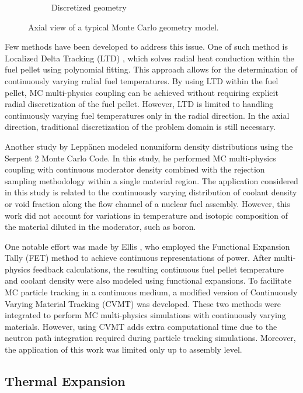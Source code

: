 \begin{figure}
\begin{subfigure}[b]{0.25\textwidth}
        \caption{Discretized geometry}
        \label{fig_1b}
    \end{subfigure}
    \caption{Axial view of a typical Monte Carlo geometry model.}
       \label{fig_1}
\end{figure}

Few methods have been developed to address this issue. One of such method is Localized Delta Tracking (LTD) \cite{nchoi_2020}, which solves radial heat conduction within the fuel pellet using polynomial fitting. This approach allows for the determination of continuously varying radial fuel temperatures. By using LTD within the fuel pellet, MC multi-physics coupling can be achieved without requiring explicit radial discretization of the fuel pellet. However, LTD is limited to handling continuously varying fuel temperatures only in the radial direction. In the axial direction, traditional discretization of the problem domain is still necessary.

Another study by Leppänen \cite{leppanen_2013} modeled nonuniform density distributions using the Serpent 2 Monte Carlo Code. In this study, he performed MC multi-physics coupling with continuous moderator density combined with the rejection sampling methodology within a single material region. The application considered in this study is related to the continuously varying distribution of coolant density or void fraction along the flow channel of a nuclear fuel assembly. However, this work did not account for variations in temperature and isotopic composition of the material diluted in the moderator, such as boron.

One notable effort was made by Ellis \cite{ellis}, who employed the Functional Expansion Tally (FET) method \cite{chadsey,gries} to achieve continuous representations of power. After multi-physics feedback calculations, the resulting continuous fuel pellet temperature and coolant density were also modeled using functional expansions. To facilitate MC particle tracking in a continuous medium, a modified version of Continuously Varying Material Tracking (CVMT) \cite{brown} was developed. These two methods were integrated to perform MC multi-physics simulations with continuously varying materials. However, using CVMT adds extra computational time due to the neutron path integration required during particle tracking simulations. Moreover, the application of this work was limited only up to assembly level.

\subsection{Thermal Expansion} \label{sec12}

